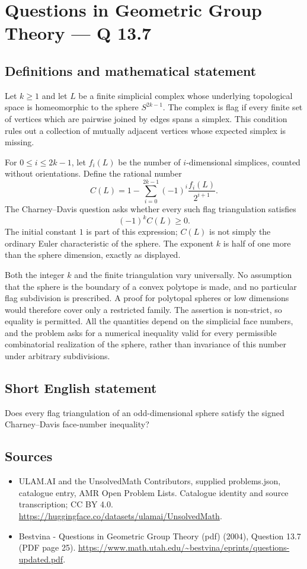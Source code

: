 \documentclass[11pt,a4paper]{article}
\begin{document}
\section*{Questions in Geometric Group Theory — Q 13.7}\label{statement}

\subsection{Definitions and mathematical statement}
Let $k\geq1$ and let $L$ be a finite simplicial complex whose underlying topological space is homeomorphic to the sphere $S^{2k-1}$. The complex is flag if every finite set of vertices which are pairwise joined by edges spans a simplex. This condition rules out a collection of mutually adjacent vertices whose expected simplex is missing.

For $0\leq i\leq2k-1$, let $f_i(L)$ be the number of $i$-dimensional simplices, counted without orientations. Define the rational number
\[
 C(L)=1-\sum_{i=0}^{2k-1}(-1)^i\frac{f_i(L)}{2^{i+1}}.
\]
The Charney--Davis question asks whether every such flag triangulation satisfies
\[
 (-1)^k C(L)\geq0.
\]
The initial constant $1$ is part of this expression; $C(L)$ is not simply the ordinary Euler characteristic of the sphere. The exponent $k$ is half of one more than the sphere dimension, exactly as displayed.

Both the integer $k$ and the finite triangulation vary universally. No assumption that the sphere is the boundary of a convex polytope is made, and no particular flag subdivision is prescribed. A proof for polytopal spheres or low dimensions would therefore cover only a restricted family. The assertion is non-strict, so equality is permitted. All the quantities depend on the simplicial face numbers, and the problem asks for a numerical inequality valid for every permissible combinatorial realization of the sphere, rather than invariance of this number under arbitrary subdivisions.
\subsection{Short English statement}
Does every flag triangulation of an odd-dimensional sphere satisfy the signed Charney–Davis face-number inequality?
\subsection{Sources}
\begin{itemize}
\item[S1] ULAM.AI and the UnsolvedMath Contributors, supplied problems.json, catalogue entry, AMR Open Problem Lists. Catalogue identity and source transcription; CC BY 4.0.
\url{https://huggingface.co/datasets/ulamai/UnsolvedMath}.
\item[S2] Bestvina - Questions in Geometric Group Theory (pdf) (2004), Question 13.7 (PDF page 25). 
\url{https://www.math.utah.edu/~bestvina/eprints/questions-updated.pdf}.
\end{itemize}
\end{document}
